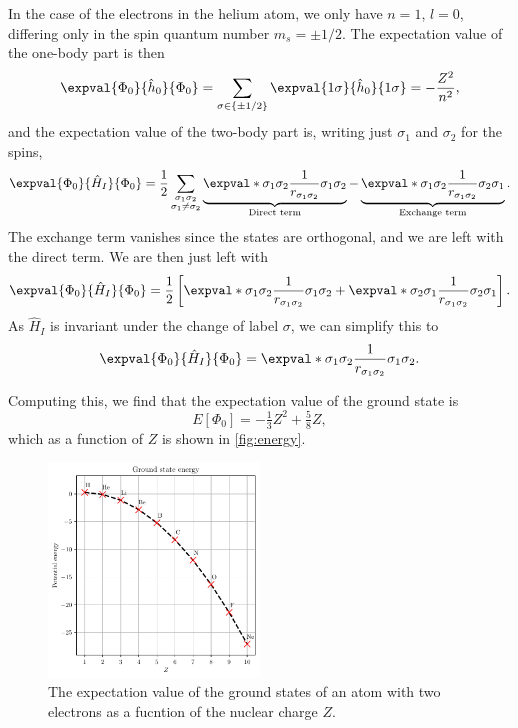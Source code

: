 In the case of the electrons in the helium atom, we only have $n = 1$, $l = 0$, differing only in the spin quantum number $m_s = \pm 1/2$.
The expectation value of the one-body part is then
\begin{equation*}
    \expval{\Phi_0}{\hat{h}_0}{\Phi_0} = \sum_{\sigma \in \{\pm 1/2\}} \expval{1\sigma}{\hat{h}_0}{1\sigma} = -\frac{Z^2}{n^2},
\end{equation*}
and the expectation value of the two-body part is, writing just $\sigma_1$ and $\sigma_2$ for the spins,
\begin{equation*}
    \expval{\Phi_0}{\hat{H}_I}{\Phi_0}
    = \frac{1}{2} \sum_{\substack{\sigma_1\sigma_2\\ \sigma_1 \neq \sigma_2}}
    \underbrace{\expval*{\sigma_1 \sigma_2}{\frac{1}{r_{\sigma_1\sigma_2}}}{\sigma_1 \sigma_2}}_{\textnormal{Direct term}}
    - \underbrace{\expval*{\sigma_1 \sigma_2}{\frac{1}{r_{\sigma_1\sigma_2}}}{\sigma_2\sigma_1}}_{\textnormal{Exchange term}}.
\end{equation*}
The exchange term vanishes since the states are orthogonal, and we are left with the direct term.
We are then just left with
\begin{equation*}
    \expval{\Phi_0}{\hat{H}_I}{\Phi_0} = \frac{1}{2}\left[ \expval*{\sigma_1 \sigma_2}{\frac{1}{r_{\sigma_1 \sigma_2}}}{\sigma_1 \sigma_2} + \expval*{\sigma_2 \sigma_1}{\frac{1}{r_{\sigma_1 \sigma_2}}}{\sigma_2 \sigma_1}\right].
\end{equation*}
As $\hat{H}_I$ is invariant under the change of label $\sigma$, we can simplify this to
\begin{equation*}
    \expval{\Phi_0}{\hat{H}_I}{\Phi_0} = \expval*{\sigma_1 \sigma_2}{\frac{1}{r_{\sigma_1 \sigma_2}}}{\sigma_1 \sigma_2}.
\end{equation*}

Computing this, we find that the expectation value of the ground state is
\begin{equation}
    E[\Phi_0] = -\tfrac{1}{3}Z^2 + \tfrac{5}{8}Z,
\end{equation}
which as a function of $Z$ is shown in \autoref{fig:energy}.

\begin{figure}[ht]
    \centering
    \includegraphics[width=0.5\textwidth]{figs/energy_plot.pdf}
    \caption{The expectation value of the ground states of an atom with two electrons as a fucntion of the nuclear charge $Z$.\label{fig:energy}}
\end{figure}
